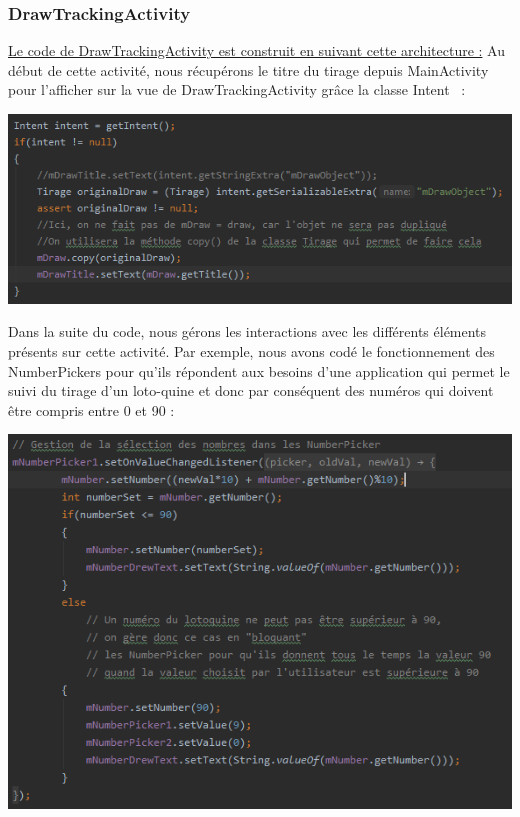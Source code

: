 \documentclass{article}
\begin{document}
\subsubsection{DrawTrackingActivity}
\vspace{1em}
\underline{Le code de DrawTrackingActivity est construit en suivant cette architecture :}
\vspace{1em}
\newline Au début de cette activité, nous récupérons le titre du tirage depuis MainActivity pour l'afficher sur la vue de DrawTrackingActivity grâce la classe Intent~\cite{intent} :
\newline
\begin{center} \includegraphics[scale=0.8]{intent_DrawTrackingActivity.png} \end{center}
\vspace{1em}
Dans la suite du code, nous gérons les interactions avec les différents éléments présents sur cette activité. Par exemple, nous avons codé le fonctionnement des NumberPickers pour qu'ils répondent aux besoins d'une application qui permet le suivi du tirage d'un loto-quine et donc par conséquent des numéros qui doivent être compris entre 0 et 90 :
\newline
\begin{center} \includegraphics[scale=0.8]{numberPicker_DrawTrackingActivity.png} \end{center}
\end{document}
